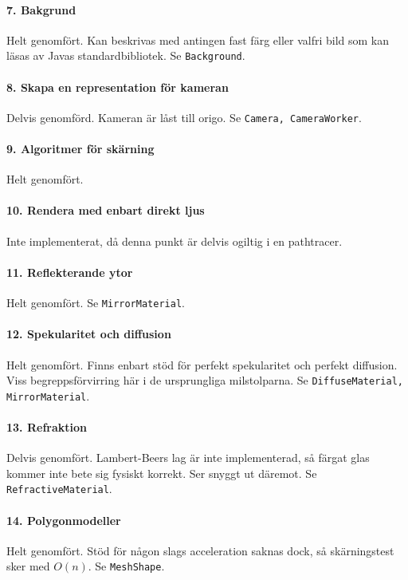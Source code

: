 \documentclass{article}
\begin{document}
\paragraph{7. Bakgrund}
Helt genomfört. Kan beskrivas med antingen fast färg eller valfri bild
som kan läsas av Javas standardbibliotek. Se \texttt{Background}.

\paragraph{8. Skapa en representation för kameran}
Delvis genomförd. Kameran är låst till origo. Se \texttt{Camera,
  CameraWorker}.

\paragraph{9. Algoritmer för skärning}
Helt genomfört.

\paragraph{10. Rendera med enbart direkt ljus}
Inte implementerat, då denna punkt är delvis ogiltig i en pathtracer.

\paragraph{11. Reflekterande ytor}
Helt genomfört. Se \texttt{MirrorMaterial}.

\paragraph{12. Spekularitet och diffusion}
Helt genomfört. Finns enbart stöd för perfekt spekularitet och perfekt
diffusion. Viss begreppsförvirring här i de ursprungliga milstolparna.
Se \texttt{DiffuseMaterial, MirrorMaterial}.

\paragraph{13. Refraktion}
Delvis genomfört. Lambert-Beers lag är inte implementerad, så färgat
glas kommer inte bete sig fysiskt korrekt. Ser snyggt ut däremot.
Se \texttt{RefractiveMaterial}.

\paragraph{14. Polygonmodeller}
Helt genomfört. Stöd för någon slags acceleration saknas dock, så
skärningstest sker med $O(n)$. Se \texttt{MeshShape}.
\end{document}
